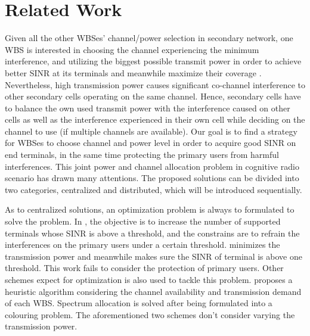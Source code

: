 \section{Related Work}
\label{relatedWork}
Given all the other WBSes' channel/power selection in secondary network, one WBS is interested in choosing the channel experiencing the minimum interference, and utilizing the biggest possible transmit power in order to achieve better SINR at its terminals and meanwhile maximize their coverage \cite{wuinfocom09, HoangPowerChannel2010}. 
Nevertheless, high transmission power causes significant co-channel interference to other secondary cells operating on the same channel. 
Hence, secondary cells have to balance the own used transmit power with the interference caused on other cells as well as the interference experienced in their own cell while deciding on the channel to use (if multiple channels are available). 
Our goal is to find a strategy for WBSes to choose channel and power level in order to acquire good SINR on end terminals, in the same time protecting the primary users from harmful interferences.
This joint power and channel allocation problem in cognitive radio scenario has drawn many attentions.
The proposed solutions can be divided into two categories, centralized and distributed, which will be introduced sequentially.

As to centralized solutions, an optimization problem is always to formulated to solve the problem.
In \cite{downlink-centralized-08-TWC}, the objective is to increase the number of supported terminals whose SINR is above a threshold, and the constrains are to refrain the interferences on the primary users under a certain threshold.
\cite{joint_power_channel_linkpair_08ICT} minimizes the transmission power and meanwhile makes sure the SINR of terminal is above one threshold.
This work fails to consider the protection of primary users.
Other schemes expect for optimization is also used to tackle this problem.
\cite{centralized_80222_sharing_ifip2011} proposes a heuristic algorithm considering the channel availability and transmission demand of each WBS.
Spectrum allocation is solved after being formulated into a colouring problem.
The aforementioned two schemes don't consider varying the transmission power.

